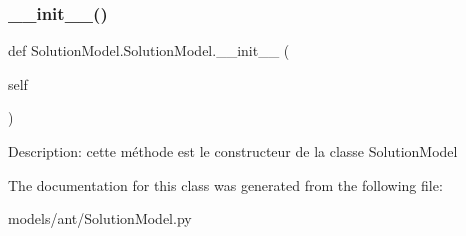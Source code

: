 \subsubsection{\texorpdfstring{\+\_\+\+\_\+init\+\_\+\+\_\+()}{\_\_init\_\_()}}
{\footnotesize\ttfamily def Solution\+Model.\+Solution\+Model.\+\_\+\+\_\+init\+\_\+\+\_\+ (\begin{DoxyParamCaption}\item[{}]{self }\end{DoxyParamCaption})}

\begin{DoxyVerb}Description: cette méthode est le constructeur de la classe SolutionModel
\end{DoxyVerb}
 

The documentation for this class was generated from the following file\+:\begin{DoxyCompactItemize}
\item 
models/ant/Solution\+Model.\+py\end{DoxyCompactItemize}
